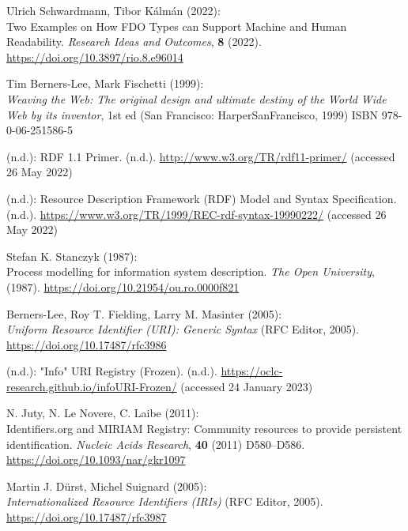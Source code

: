 \begin{thebibliography}{9}
Ulrich Schwardmann, Tibor Kálmán (2022): \\
Two {Examples} on {How FDO
Types} can {Support Machine} and {Human Readability}. \emph{Research
Ideas and Outcomes}, \textbf{8} (2022).
\url{https://doi.org/10.3897/rio.8.e96014}

Tim Berners-Lee, Mark Fischetti (1999): \\
\emph{Weaving the {Web}: The
original design and ultimate destiny of the {World Wide Web} by its
inventor}, 1st ed ({San Francisco}: {HarperSanFrancisco}, 1999) ISBN
978-0-06-251586-5

(n.d.): {RDF} 1.1 {Primer}. (n.d.).
\url{http://www.w3.org/TR/rdf11-primer/} (accessed 26 May 2022)

(n.d.): Resource {Description Framework} ({RDF}) {Model} and {Syntax
Specification}. (n.d.).
\url{https://www.w3.org/TR/1999/REC-rdf-syntax-19990222/} (accessed 26
May 2022)

Stefan K. Stanczyk (1987): \\
Process modelling for information system
description. \emph{The Open University}, (1987).
\url{https://doi.org/10.21954/ou.ro.0000f821}

Berners-Lee, Roy T. Fielding, Larry M. Masinter (2005): \\
\emph{Uniform
{Resource Identifier} ({URI}): {Generic Syntax}} ({RFC Editor}, 2005).
\url{https://doi.org/10.17487/rfc3986}

(n.d.): "Info" {URI Registry} ({Frozen}). (n.d.).
\url{https://oclc-research.github.io/infoURI-Frozen/} (accessed 24
January 2023)

N. Juty, N. Le Novere, C. Laibe (2011): \\
Identifiers.org and {MIRIAM
Registry}: Community resources to provide persistent identification.
\emph{Nucleic Acids Research}, \textbf{40} (2011) D580--D586.
\url{https://doi.org/10.1093/nar/gkr1097}

Martin J. Dürst, Michel Suignard (2005): \\
\emph{Internationalized
{Resource Identifiers} ({IRIs})} ({RFC Editor}, 2005).
\url{https://doi.org/10.17487/rfc3987}


\end{thebibliography}
